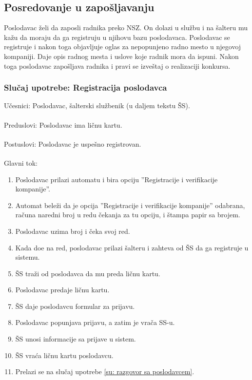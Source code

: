 \subsection{Posredovanje u zapo\v sljavanju}

Poslodavac \v zeli da zaposli radnika preko NSZ. On dolazi u slu\v zbu i na \v salteru mu ka\v zu da moraju da ga registruju u njihovu bazu poslodavaca. Poslodavac se registruje i nakon toga objavljuje oglas za nepopunjeno radno mesto u njegovoj kompaniji. Daje opis radnog mesta i uslove koje radnik mora da ispuni. Nakon toga poslodavac zapo\v sljava radnika i pravi se izve\v staj o realizaciji konkursa. 


\subsubsection{Slu\v caj upotrebe: Registracija poslodavca}

\noindent Učesnici: Poslodavac, šalterski službenik (u daljem tekstu \v SS).
\\
\\ Preduslovi: Poslodavac ima ličnu kartu.
\\
\\ Postuslovi: Poslodavac je uspešno registrovan.
\\
\\ Glavni tok:
\begin{enumerate}
\item Poslodavac prilazi automatu i bira opciju ''Registracije i verifikacije kompanije''.
	\item Automat bele\v zi da je opcija ''Registracije i verifikacije kompanije'' odabrana, ra\v cuna naredni broj u redu \v cekanja za tu opciju, i \v stampa papir sa brojem.
	\item Poslodavac uzima broj i \v ceka svoj red.
	\item Kada do\dj e na red, poslodavac prilazi \v salteru i zahteva od \v SS da ga registruje u sistemu.
	\item \v SS tra\v zi od poslodavca da mu preda li\v cnu kartu.
	\item Poslodavac predaje ličnu kartu. 
	\item \v SS daje poslodavcu formular za prijavu.
    \item Poslodavac popunjava prijavu, a zatim je vra\v ca SS-u.
	\item \v SS unosi informacije sa prijave u sistem.
	\item \v SS vra\' ca ličnu kartu poslodavcu.
	\item Prelazi se na slu\v caj upotrebe \ref{su: razgovor sa poslodavcem}.
\end{enumerate}

